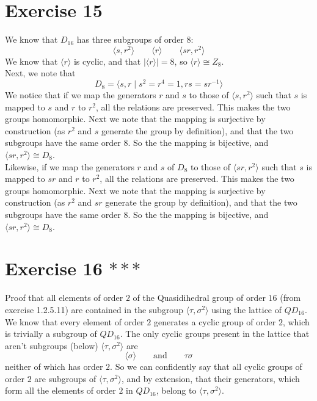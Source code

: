 \documentclass[12pt]{article}
\begin{document}
    \section*{Exercise 15}
    We know that $D_16$ has three subgroups of order $8$:
    \[ \langle s, r^2 \rangle 
    \qquad  \langle r \rangle
    \qquad \langle sr, r^2 \rangle \]
    We know that $\langle r \rangle$ is cyclic,
    and that $|\langle r \rangle| = 8$,
    so $\langle r \rangle \cong Z_8$. \\
    Next, we note that
    \[ D_8 = \langle s, r \mid s^2 = r^4 = 1, rs = sr^{-1} \rangle \]
    We notice that if we map the generators $r$ and $s$
    to those of $\langle s, r^2 \rangle$ such that $s$ is mapped to $s$
    and $r$ to $r^2$,
    all the relations are preserved.
    This makes the two groups homomorphic.
    Next we note that the mapping is surjective by construction
    (as $r^2$ and $s$ generate the group by definition),
    and that the two subgroups have the same order $8$.
    So the the mapping is bijective,
    and $\langle sr, r^2 \rangle \cong D_8$. \\
    Likewise, if we map the generators $r$ and $s$ of $D_8$
    to those of $\langle sr, r^2 \rangle$ such that $s$ is mapped to $sr$
    and $r$ to $r^2$,
    all the relations are preserved.
    This makes the two groups homomorphic.
    Next we note that the mapping is surjective by construction
    (as $r^2$ and $sr$ generate the group by definition),
    and that the two subgroups have the same order $8$.
    So the the mapping is bijective,
    and $\langle sr, r^2 \rangle \cong D_8$. \\


    \section*{Exercise 16 $***$}
    Proof that all elements of order $2$
    of the Quasidihedral group of order $16$
    (from exercise 1.2.5.11)
    are contained in the subgroup $\langle \tau, \sigma^2 \rangle$
    using the lattice of $QD_{16}$. \\
    We know that every element of order $2$
    generates a cyclic group of order $2$,
    which is trivially a subgroup of $QD_{16}$.
    The only cyclic groups present in the lattice
    that aren't subgroups (below) $\langle \tau, \sigma^2 \rangle$ are
    \[ \langle \sigma \rangle 
    \qquad \text{and} 
    \qquad \tau\sigma \]
    neither of which has order $2$.
    So we can confidently say that all cyclic groups of order $2$
    are subgroups of $\langle \tau, \sigma^2 \rangle$,
    and by extension, that their generators,
    which form all the elements of order $2$ in $QD_{16}$,
    belong to $\langle \tau, \sigma^2 \rangle$.
\end{document}
